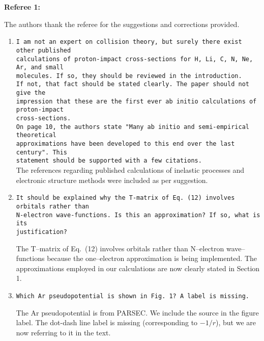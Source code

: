 \documentclass[10pt]{article}
\begin{document}
\noindent
{\bf Referee 1:}

\vspace{0.2cm}
The authors thank the referee for the suggestions and corrections 
provided.

\begin{enumerate}
 \item 
 {\tt I am not an expert on collision theory, but surely there
 exist other published \\ calculations of proton-impact
 cross-sections for H, Li, C, N, Ne, Ar, and small \\ molecules. 
 If so, they should be reviewed in the introduction. \\ If not,
 that fact should be stated clearly. The paper should not give 
 the \\ impression that these are the first ever ab initio
 calculations of proton-impact \\ cross-sections.} \\ 
 {\tt On page 10, the authors state "Many ab initio and 
 semi-empirical theoretical \\ approximations have been developed
 to this end over the last century". This \\ statement should be
 supported with a few citations.} \\
 
 \vspace{-0.25cm}
 The references regarding published calculations of inelastic 
 processes and electronic structure methods were included as per 
 suggestion.
 
 \item {\tt It should be explained why the T-matrix of Eq.~(12) 
 involves orbitals rather than \\  N-electron wave-functions. Is 
 this an approximation? If so, what is its \\ justification?}
 
 The T--matrix of Eq.~(12) involves orbitals rather than 
 N--electron wave--functions because the  one--electron
 approximation is being implemented. The approximations
 employed in our calculations are now clearly stated in 
 Section 1. 
 
 \item {\tt Which Ar pseudopotential is shown in Fig.~1? A label is 
 missing.}
 
 The Ar pseudopotential is from PARSEC. We include the source in 
 the figure label. The dot-dash line label is missing 
 (corresponding to $-1/r$), but we are now referring to it in the
 text. 
 

\end{enumerate}
\end{document}
